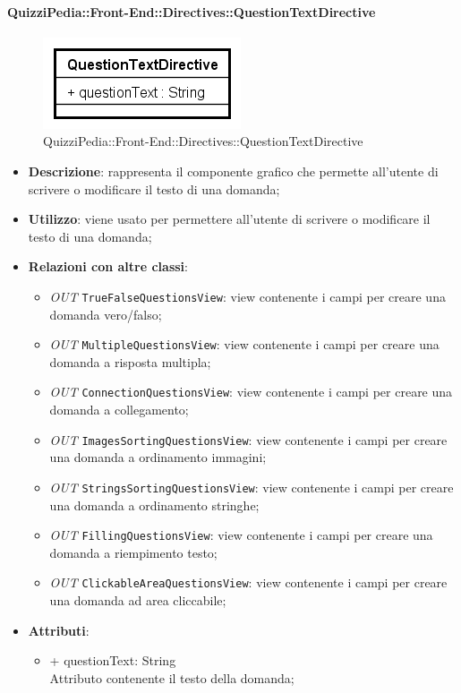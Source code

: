 \paragraph{QuizziPedia::Front-End::Directives::QuestionTextDirective}

\label{QuizziPedia::Front-End::Directives::QuestionTextDirective}

\begin{figure}[ht]
	\centering
	\includegraphics[scale=0.80,keepaspectratio]{UML/Classi/Front-End/QuizziPedia_Front-end_Directives_QuestionTextDirective.png}
	\caption{QuizziPedia::Front-End::Directives::QuestionTextDirective}
\end{figure} 
\FloatBarrier

\begin{itemize}
	\item \textbf{Descrizione}: rappresenta il componente grafico che permette all'utente di scrivere o modificare il testo di una domanda;
	\item \textbf{Utilizzo}: viene usato per permettere all'utente di scrivere o modificare il testo di una domanda;
	\item \textbf{Relazioni con altre classi}: 
	\begin{itemize}
		\item \textit{OUT} \texttt{TrueFalseQuestionsView}: view contenente i campi per creare una domanda vero/falso; 
		\item \textit{OUT} \texttt{MultipleQuestionsView}: view contenente i campi per creare una domanda a risposta multipla;
		\item \textit{OUT} \texttt{ConnectionQuestionsView}: view contenente i campi per creare una domanda a collegamento;
		\item \textit{OUT} \texttt{ImagesSortingQuestionsView}: view contenente i campi per creare una domanda a ordinamento immagini;
		\item \textit{OUT} \texttt{StringsSortingQuestionsView}: view contenente i campi per creare una domanda a ordinamento stringhe;
		\item \textit{OUT} \texttt{FillingQuestionsView}: view contenente i campi per creare una domanda a riempimento testo;
		\item \textit{OUT} \texttt{ClickableAreaQuestionsView}: view contenente i campi per creare una domanda ad area cliccabile;
	\end{itemize}
	\item \textbf{Attributi}: 
	\begin{itemize}
		\item {+ questionText: String} \\ Attributo contenente il testo della domanda;
	\end{itemize}
\end{itemize}